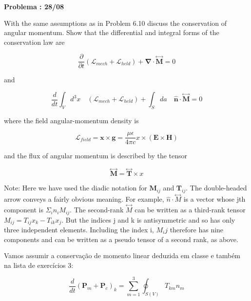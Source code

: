 \color{blue}

\textbf{Problema \paragraphnum: 28/08}
	
	With the same assumptions as in Problem 6.10 discuss the conservation of angular momentum. Show that the differential and integral forms of the conservation law are
	
	\begin{equation*}
		\frac{\partial}{\partial t}(\mathcal{L}_{mech} + \mathcal{L}_{held}) + \mathbf{\nabla} \cdot \overset{\leftrightarrow}{\textbf{M}} = 0
	\end{equation*}
	
	and
	
	\begin{equation*}
		\frac{d}{dt} \int_V d^3x\quad(\mathcal{L}_{mech} + \mathcal{L}_{held}) + \int_S da\quad \hat{\textbf{n}}\cdot \overset{\leftrightarrow}{\textbf{M}} = 0
	\end{equation*}
	
	where the field angular-momentum density is
	
	\begin{equation*}
		\mathcal{L}_{field} = \textbf{x} \times \textbf{g} = \frac{\mu \epsilon}{4\pi c} x \times (\textbf{E} \times \textbf{H})
	\end{equation*}
	
	and the flux of angular momentum is described by the tensor
	
	\begin{equation*}
		\overset{\leftrightarrow}{\textbf{M}} = \overset{\leftrightarrow}{\textbf{T}} \times x
	\end{equation*}
	
	Note: Here we have used the diadic notation for $\textbf{M}_{ij}$ and $\textbf{T}_{ij}$. The double-headed arrow conveys a fairly obvious meaning. For example, $\hat{n} \cdot \overset{\leftrightarrow}{M}$ is a vector whose jth component is $\Sigma_i n_i M_{ij}$. The second-rank $\overset{\leftrightarrow}{M}$ can be written as a third-rank tensor $M_{ij} = T_{ij}x_k - T_{ik}x_j$. But the indices j and k is antisymmetric and so has only three independent elements. Including the index i, $M_ij$ therefore has nine components and can be written as a pseudo tensor of a second rank, as above.

\color{black}
\bigskip

Vamos assumir a conservação de momento linear deduzida em classe e também na lista de exercícios 3:

\begin{equation}
	\frac{d}{dt}\left( \textbf{P}_m + \textbf{P}_c \right)_k = \sum_{m=1}^{3}\oint_{S(V)} T_{km} n_m
	\label{eq1:conservaocaodemomento}
\end{equation}

